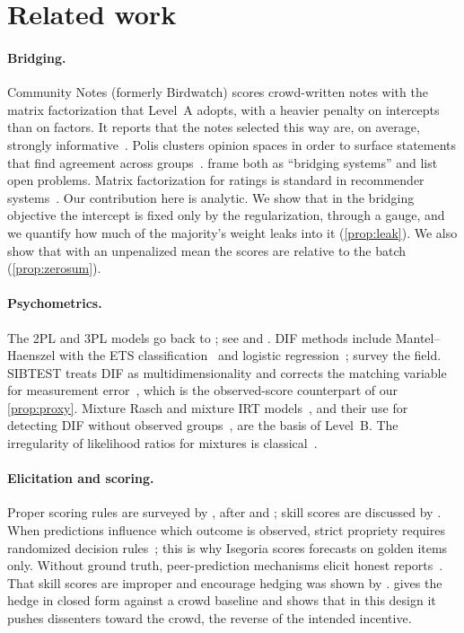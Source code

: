 \section{Related work}\label{sec:related}

\paragraph{Bridging.} Community Notes (formerly Birdwatch) scores crowd-written notes with the
matrix factorization that Level~A adopts, with a heavier penalty on intercepts than on factors. It
reports that the notes selected this way are, on average, strongly
informative~\cite{wojcik2022birdwatch}. Polis clusters opinion spaces in order to surface statements
that find agreement across groups~\cite{small2021polis}. \citet{ovadya2023bridging} frame both as
``bridging systems'' and list open problems. Matrix factorization for ratings is standard in
recommender systems~\cite{koren2009matrix}. Our contribution here is analytic. We show that in the
bridging objective the intercept is fixed only by the regularization, through a gauge, and we
quantify how much of the majority's weight leaks into it (\cref{prop:leak}). We also show that
with an unpenalized mean the scores are relative to the batch (\cref{prop:zerosum}).

\paragraph{Psychometrics.} The 2PL and 3PL models go back to \citet{birnbaum1968}; see
\citet{lord1980} and \citet{hambleton1991}. DIF methods include Mantel--Haenszel with the ETS
classification~\cite{mantel1959,holland1988mh,zieky1993} and logistic
regression~\cite{swaminathan1990}; \citet{holland1993dif} survey the field. SIBTEST treats DIF as
multidimensionality and corrects the matching variable for measurement
error~\cite{shealy1993sibtest}, which is the observed-score counterpart of our \cref{prop:proxy}.
Mixture Rasch and mixture IRT models~\cite{rost1990}, and their use for detecting DIF without
observed groups~\cite{cohen2005mixture}, are the basis of Level~B. The irregularity of likelihood
ratios for mixtures is classical~\cite{self1987,mclachlan2000}.

\paragraph{Elicitation and scoring.} Proper scoring rules are surveyed by
\citet{gneiting2007scoring}, after \citet{brier1950} and \citet{savage1971}; skill scores are
discussed by \citet{murphy1988skill}. When predictions influence which outcome is observed,
strict propriety requires randomized decision rules~\cite{othman2010decision,chen2014eliciting}; this is
why Isegoria scores forecasts on golden items only. Without ground truth, peer-prediction
mechanisms elicit honest reports~\cite{miller2005peer,prelec2004bts,dasgupta2013crowdsourced,shnayder2016informed}.
That skill scores are improper and encourage hedging was shown by \citet{murphy1973hedging}.
 gives the hedge in closed form against a crowd baseline and shows that in this
design it pushes dissenters toward the crowd, the reverse of the intended incentive.

